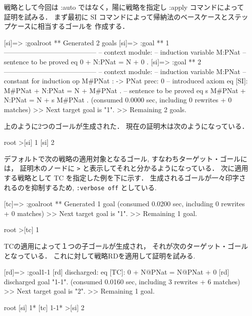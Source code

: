 \documentclass[a4paper,oneside,10pt,here]{memoir}
\newenvironment{vvtm}%
{\parskip=0pt\lineskip=0pt\begin{center}\begin{minipage}{0.8\textwidth}\begin{snugshade}}%
  {\end{snugshade}\end{minipage}\end{center}}
\begin{document}
戦略として今回は :auto ではなく，陽に戦略を指定し :apply コマンドによって証明を試みる．
まず最初に SI コマンドによって帰納法のベースケースとステップケースに相当するゴールを
作成する．

\begin{vvtm}
  \begin{simplev}

[si]=> :goal{root}
** Generated 2 goals
[si]=>
:goal { ** 1 -----------------------------------------
  -- context module: %
  -- induction variable
    M:PNat
  -- sentence to be proved
    eq 0 + N:PNat = N + 0 .
}
[si]=>
:goal { ** 2 -----------------------------------------
  -- context module: %
  -- induction variable
    M:PNat
  -- constant for induction
    op M#PNat : -> PNat { prec: 0 }
  -- introduced axiom
    eq [SI]: M#PNat + N:PNat = N + M#PNat .
  -- sentence to be proved
    eq s M#PNat + N:PNat = N + s M#PNat .
}
(consumed 0.0000 sec, including 0 rewrites + 0 matches)
>> Next target goal is "1".
>> Remaining 2 goals.
  \end{simplev}
\end{vvtm}

上のように2つのゴールが生成された．
現在の証明木は次のようになっている．
\begin{vvtm}
  \begin{simplev}
root
>[si] 1
[si]  2
  \end{simplev}
\end{vvtm}

デフォルトで次の戦略の適用対象となるゴール,
すなわちターゲット・ゴールには，
証明木のノードに \verb|>| と表示してそれと分かるようになっている．
次に適用する戦略として TC を指定した例を下に示す．
生成されるゴールが一々印字されるのを抑制するため,
\texttt{:verbose off} としている.
\begin{vvtm}
  \begin{simplev}


[tc]=> :goal{root}
** Generated 1 goal
(consumed 0.0200 sec, including 0 rewrites + 0 matches)
>> Next target goal is "1".
>> Remaining 1 goal.

root
>[tc] 1
  \end{simplev}
\end{vvtm}
TCの適用によって１つの子ゴールが生成され，
それが次のターゲット・ゴールとなっている．
これに対して戦略RDを適用して証明を試みる.
\begin{vvtm}
\begin{simplev}

[rd]=> :goal{1-1}
[rd] discharged: 
  eq [TC]: 0 + N@PNat = N@PNat + 0
[rd] discharged goal "1-1".
(consumed 0.0160 sec, including 3 rewrites + 6 matches)
>> Next target goal is "2".
>> Remaining 1 goal.

root
[si]  1*
[tc]  1-1*
>[si] 2
\end{simplev}
\end{vvtm}
\end{document}
